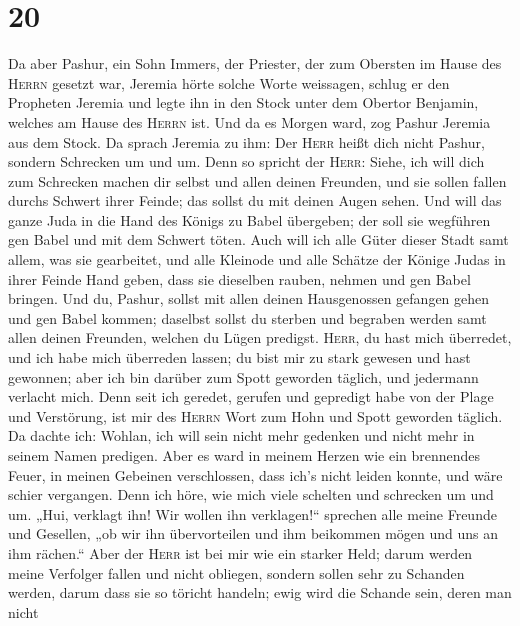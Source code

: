 \hypertarget{section-19}{%
\section{20}\label{section-19}}

 Da aber Pashur, ein Sohn Immers, der Priester, der zum
Obersten im Hause des \textsc{Herrn} gesetzt war, Jeremia hörte solche
Worte weissagen,  schlug er den Propheten Jeremia und
legte ihn in den Stock unter dem Obertor Benjamin, welches am Hause des
\textsc{Herrn} ist.  Und da es Morgen ward, zog Pashur
Jeremia aus dem Stock. Da sprach Jeremia zu ihm: Der \textsc{Herr} heißt
dich nicht Pashur, sondern Schrecken um und um.  Denn so
spricht der \textsc{Herr}: Siehe, ich will dich zum Schrecken machen dir
selbst und allen deinen Freunden, und sie sollen fallen durchs Schwert
ihrer Feinde; das sollst du mit deinen Augen sehen. Und will das ganze
Juda in die Hand des Königs zu Babel übergeben; der soll sie wegführen
gen Babel und mit dem Schwert töten.  Auch will ich alle
Güter dieser Stadt samt allem, was sie gearbeitet, und alle Kleinode und
alle Schätze der Könige Judas in ihrer Feinde Hand geben, dass sie
dieselben rauben, nehmen und gen Babel bringen.  Und du,
Pashur, sollst mit allen deinen Hausgenossen gefangen gehen und gen
Babel kommen; daselbst sollst du sterben und begraben werden samt allen
deinen Freunden, welchen du Lügen predigst. 
\textsc{Herr}, du hast mich überredet, und ich habe mich überreden
lassen; du bist mir zu stark gewesen und hast gewonnen; aber ich bin
darüber zum Spott geworden täglich, und jedermann verlacht mich.
 Denn seit ich geredet, gerufen und gepredigt habe von der
Plage und Verstörung, ist mir des \textsc{Herrn} Wort zum Hohn und Spott
geworden täglich.  Da dachte ich: Wohlan, ich will sein
nicht mehr gedenken und nicht mehr in seinem Namen predigen. Aber es
ward in meinem Herzen wie ein brennendes Feuer, in meinen Gebeinen
verschlossen, dass ich's nicht leiden konnte, und wäre schier vergangen.
 Denn ich höre, wie mich viele schelten und schrecken um
und um. „Hui, verklagt ihn! Wir wollen ihn verklagen!{}`` sprechen alle
meine Freunde und Gesellen, „ob wir ihn übervorteilen und ihm beikommen
mögen und uns an ihm rächen.``  Aber der \textsc{Herr}
ist bei mir wie ein starker Held; darum werden meine Verfolger fallen
und nicht obliegen, sondern sollen sehr zu Schanden werden, darum dass
sie so töricht handeln; ewig wird die Schande sein, deren man nicht
